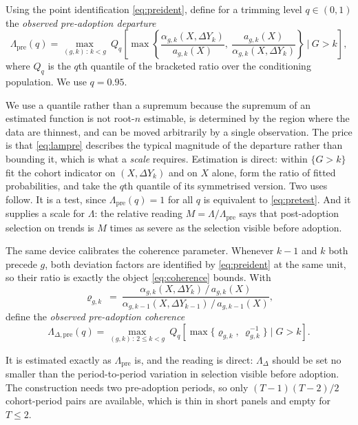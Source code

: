 \documentclass[12pt]{article}
\theoremstyle{remark}
\begin{document}
Using the point identification \eqref{eq:preident}, define for a trimming level
$q \in (0,1)$ the \emph{observed pre-adoption departure}
\begin{equation}
\Lambda_{\mathrm{pre}}(q) = \max_{(g,k)\,:\,k < g}\ Q_q\!\left[
\max\left\{ \frac{\alpha_{g,k}(X, \Delta Y_k)}{a_{g,k}(X)},\
            \frac{a_{g,k}(X)}{\alpha_{g,k}(X, \Delta Y_k)} \right\}
\ \bigg|\ G > k \right],
\label{eq:lampre}
\end{equation}
where $Q_q$ is the $q$th quantile of the bracketed ratio over the conditioning population.
We use $q = 0.95$.

We use a quantile rather than a supremum because the supremum of an estimated function is
not root-$n$ estimable, is determined by the region where the data are thinnest, and can be
moved arbitrarily by a single observation. The price is that \eqref{eq:lampre} describes
the typical magnitude of the departure rather than bounding it, which is what a
\emph{scale} requires. Estimation is direct: within $\{G > k\}$ fit the cohort indicator
on $(X, \Delta Y_k)$ and on $X$ alone, form the ratio of fitted probabilities, and take the
$q$th quantile of its symmetrised version. Two uses follow. It is a test, since
$\Lambda_{\mathrm{pre}}(q) = 1$ for all $q$ is equivalent to \eqref{eq:pretest}. And it
supplies a scale for $\Lambda$: the relative reading $M = \Lambda/\Lambda_{\mathrm{pre}}$
says that post-adoption selection on trends is $M$ times as severe as the selection
visible before adoption.

The same device calibrates the coherence parameter. Whenever $k-1$ and $k$ both precede
$g$, both deviation factors are identified by \eqref{eq:preident} at the same unit, so
their ratio is exactly the object \eqref{eq:coherence} bounds. With
\[
\varrho_{g,k} \ =\ \frac{\alpha_{g,k}(X, \Delta Y_k)\,/\,a_{g,k}(X)}
                        {\alpha_{g,k-1}(X, \Delta Y_{k-1})\,/\,a_{g,k-1}(X)},
\]
define the \emph{observed pre-adoption coherence}
\begin{equation}
\Lambda_{\Delta,\mathrm{pre}}(q) = \max_{(g,k)\,:\,2 \le k < g}\
Q_q\!\left[\max\{\varrho_{g,k},\ \varrho_{g,k}^{-1}\} \mid G > k\right].
\label{eq:lamDpre}
\end{equation}

It is estimated exactly as $\Lambda_{\mathrm{pre}}$ is, and the reading is direct:
$\Lambda_\Delta$ should be set no smaller than the period-to-period variation in selection
visible before adoption. The construction needs two pre-adoption periods, so only
$(T{-}1)(T{-}2)/2$ cohort-period pairs are available, which is thin in short panels and
empty for $T \le 2$.
\end{document}
